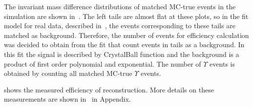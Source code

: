 The invariant mass difference distributions of matched MC-true events in the
\chib simulation are shown in~. The left tails are
almost flat at these plots, so in the \chib fit model for real data, described
in~, the events corresponding to these tails are matched as
background. Therefore, the number of \chib events for efficiency calculation
was decided to obtain from the fit that count events in tails as a background.
In this fit the signal is described by CrystalBall function and the background
is a product of first order polynomial and exponential. The number of
$\Upsilon$ events is obtained by counting all matched MC-true $\Upsilon$
events.




 shows the measured efficiency of \chib reconstruction.
More details on these measurements are shown
in~ in Appendix.


